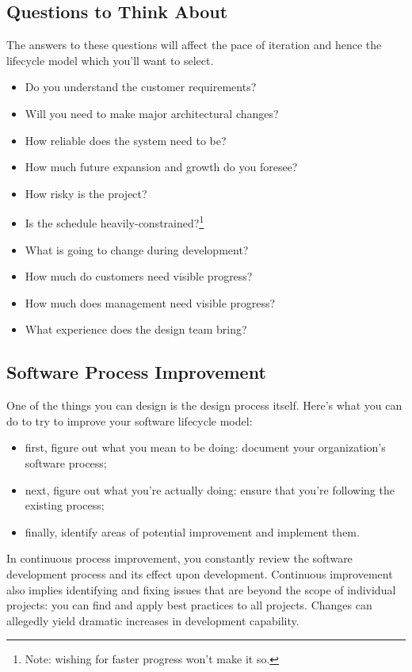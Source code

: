 \subsection*{Questions to Think About}
The answers to these questions will affect the pace of iteration and
hence the lifecycle model which you'll want to select.\\[-2em]
\begin{itemize}
\item Do you understand the customer requirements?
\item Will you need to make major architectural changes?
\item How reliable does the system need to be?
\item How much future expansion and growth do you foresee?
\item How risky is the project?
\item Is the schedule heavily-constrained?\footnote{Note: wishing for faster progress won't make it so.}
\item What is going to change during development?
\item How much do customers need visible progress?
\item How much does management need visible progress?
\item What experience does the design team bring?
\end{itemize}

\subsection*{Software Process Improvement}
One of the things you can
design is the design process itself. Here's what you can do to try to 
improve your software lifecycle model:\\[-2.5em]

\begin{itemize}
\item first, figure out what you mean to be doing: document your organization's software process;
\item next, figure out what you're actually doing: ensure that you're following the existing process; 
\item finally, identify areas of potential improvement and implement them.
\end{itemize}

In continuous process improvement, you constantly review the software
development process and its effect upon development. Continuous improvement 
also implies identifying and fixing issues that are
beyond the scope of individual projects: you can find and apply best
practices to all projects. Changes can allegedly yield dramatic
increases in development capability.





